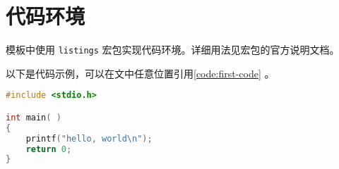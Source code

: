 \chapter{代码环境}
模板中使用 \texttt{listings} 宏包实现代码环境。详细用法见宏包的官方说明文档。

以下是代码示例，可以在文中任意位置引用\autoref{code:first-code} 。
\begin{lstlisting}[language=C, caption=示例代码, label={code:first-code}]
#include <stdio.h>

int main( )
{
    printf("hello, world\n");
    return 0;
}
\end{lstlisting}
